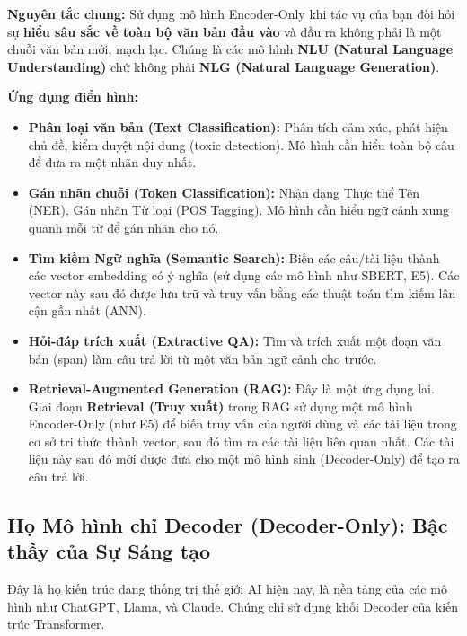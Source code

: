 \begin{tcolorbox}[
    title=Tổng kết: Điểm mạnh và Ứng dụng của Encoder-Only,
    colback=blue!5!white, colframe=blue!75!black, fonttitle=\bfseries
]
\textbf{Nguyên tắc chung:} Sử dụng mô hình Encoder-Only khi tác vụ của bạn đòi hỏi sự \textbf{hiểu sâu sắc về toàn bộ văn bản đầu vào} và đầu ra không phải là một chuỗi văn bản mới, mạch lạc. Chúng là các mô hình \textbf{NLU (Natural Language Understanding)} chứ không phải \textbf{NLG (Natural Language Generation)}.

\textbf{Ứng dụng điển hình:}
\begin{itemize}
    \item \textbf{Phân loại văn bản (Text Classification):} Phân tích cảm xúc, phát hiện chủ đề, kiểm duyệt nội dung (toxic detection). Mô hình cần hiểu toàn bộ câu để đưa ra một nhãn duy nhất.
    \item \textbf{Gán nhãn chuỗi (Token Classification):} Nhận dạng Thực thể Tên (NER), Gán nhãn Từ loại (POS Tagging). Mô hình cần hiểu ngữ cảnh xung quanh mỗi từ để gán nhãn cho nó.
    \item \textbf{Tìm kiếm Ngữ nghĩa (Semantic Search):} Biến các câu/tài liệu thành các vector embedding có ý nghĩa (sử dụng các mô hình như SBERT, E5). Các vector này sau đó được lưu trữ và truy vấn bằng các thuật toán tìm kiếm lân cận gần nhất (ANN).
    \item \textbf{Hỏi-đáp trích xuất (Extractive QA):} Tìm và trích xuất một đoạn văn bản (span) làm câu trả lời từ một văn bản ngữ cảnh cho trước.
    \item \textbf{Retrieval-Augmented Generation (RAG):} Đây là một ứng dụng lai. Giai đoạn \textbf{Retrieval (Truy xuất)} trong RAG sử dụng một mô hình Encoder-Only (như E5) để biến truy vấn của người dùng và các tài liệu trong cơ sở tri thức thành vector, sau đó tìm ra các tài liệu liên quan nhất. Các tài liệu này sau đó mới được đưa cho một mô hình sinh (Decoder-Only) để tạo ra câu trả lời.
\end{itemize}
\end{tcolorbox}

\subsection{Họ Mô hình chỉ Decoder (Decoder-Only): Bậc thầy của Sự Sáng tạo}
\label{ssec:decoder_only}
Đây là họ kiến trúc đang thống trị thế giới AI hiện nay, là nền tảng của các mô hình như ChatGPT, Llama, và Claude. Chúng chỉ sử dụng khối Decoder của kiến trúc Transformer.

